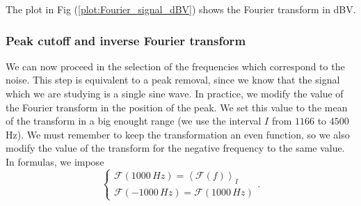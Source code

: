 \documentclass[a4paper,12pt]{article}
\begin{document}
\par The plot in Fig (\ref{plot:Fourier_signal_dBV}) shows the Fourier transform in dBV.


\subsubsection{Peak cutoff and inverse Fourier transform }
\par We can now proceed in the selection of the frequencies which correspond to 
the noise. This step is equivalent to a peak removal, since we know that the signal 
which we are studying is a single sine wave. In practice, we modify the value of 
the Fourier transform in the position of the peak. We set this value to the mean 
of the transform in a big enought range (we use the interval $I$ from $1166$ to $4500$ Hz). 
We must remember to keep the transformation an even function, so we also modify the 
value of the transform for the negative frequency to the same value. In formulas, 
we impose 
\[
\begin{cases}
    \mathcal{F}(1000\, Hz) = \left\langle \mathcal{F}(f) \right\rangle_I \\
    \mathcal{F}(-1000\, Hz) = \mathcal{F}(1000\, Hz)
\end{cases}.
\]
\end{document}
